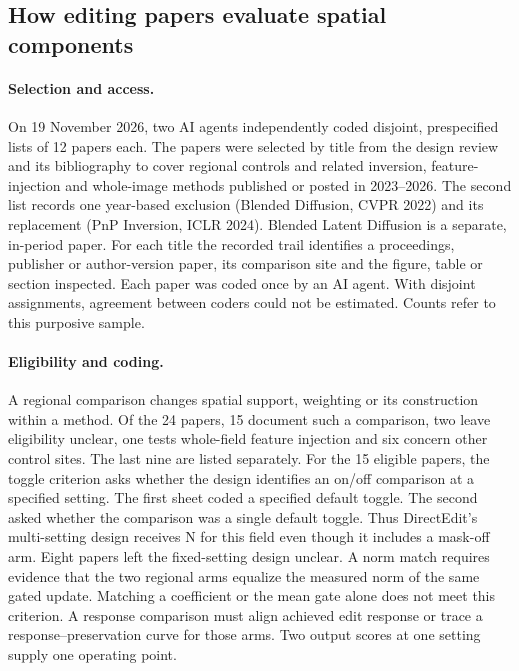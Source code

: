 \subsection{How editing papers evaluate spatial components}
\paragraph{Selection and access.} On 19 November 2026, two AI agents independently coded disjoint, prespecified lists of 12 papers each. The papers were selected by title from the design review and its bibliography to cover regional controls and related inversion, feature-injection and whole-image methods published or posted in 2023--2026. The second list records one year-based exclusion (Blended Diffusion, CVPR 2022) and its replacement (PnP Inversion, ICLR 2024). Blended Latent Diffusion is a separate, in-period paper. For each title the recorded trail identifies a proceedings, publisher or author-version paper, its comparison site and the figure, table or section inspected. Each paper was coded once by an AI agent. With disjoint assignments, agreement between coders could not be estimated. Counts refer to this purposive sample.

\paragraph{Eligibility and coding.} A regional comparison changes spatial support, weighting or its construction within a method. Of the 24 papers, 15 document such a comparison, two leave eligibility unclear, one tests whole-field feature injection and six concern other control sites. The last nine are listed separately. For the 15 eligible papers, the toggle criterion asks whether the design identifies an on/off comparison at a specified setting. The first sheet coded a specified default toggle. The second asked whether the comparison was a single default toggle. Thus DirectEdit's multi-setting design receives N for this field even though it includes a mask-off arm. Eight papers left the fixed-setting design unclear. A norm match requires evidence that the two regional arms equalize the measured norm of the same gated update. Matching a coefficient or the mean gate alone does not meet this criterion. A response comparison must align achieved edit response or trace a response--preservation curve for those arms. Two output scores at one setting supply one operating point.


